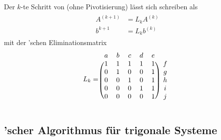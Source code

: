Der $k$-te Schritt von  (ohne Pivotisierung) lässt sich schreiben als 
\begin{align}
	\begin{split}
	A^{(k+1)} &= L_kA^{(k)} \\
	b^{k+1} &= L_kb^{(k)}
	\end{split}
\end{align}
mit der 'schen Eliminationsmatrix
\begin{align}
	L_k = \begin{blockarray}{cccccc}
	a & b & c & d & e \\
	\begin{block}{(ccccc)c}
	1 & 1 & 1 & 1 & 1 & f \\
	0 & 1 & 0 & 0 & 1 & g \\
	0 & 0 & 1 & 0 & 1 & h \\
	0 & 0 & 0 & 1 & 1 & i \\
	0 & 0 & 0 & 0 & 1 & j \\
	\end{block}
	\end{blockarray}
\end{align}

\subsection{'scher Algorithmus für trigonale Systeme}